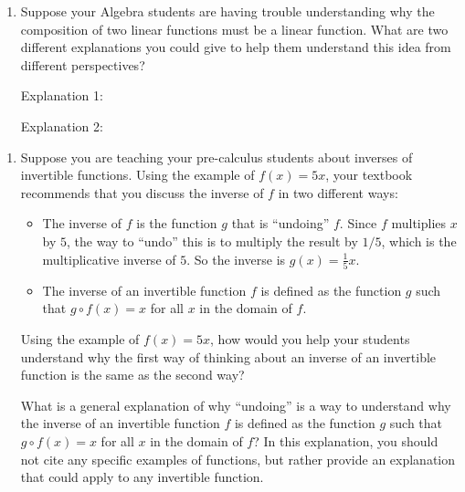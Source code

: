 \documentclass[10pt]{article}
\begin{document}
\newpage
\begin{enumerate}[resume]
\item Suppose your Algebra students are having trouble understanding why the composition of two linear functions must be a linear function. What are two different explanations you could give to help them understand this idea from different perspectives?

\begin{mdframed}
Explanation 1:
\vspace*{3in}
\end{mdframed}

\begin{mdframed}
Explanation 2: 
\vspace*{3in}
\end{mdframed}
\newpage 

\end{enumerate}

 
\begin{enumerate}[resume]
\item Suppose you are teaching your pre-calculus students about inverses of invertible functions. Using the example of $f(x)=5x$, your textbook recommends that you discuss the inverse of $f$ in two different ways:
	\begin{itemize}
	\item The inverse of $f$ is the function $g$ that is ``undoing'' $f$. Since $f$ multiplies $x$ by $5$, the way to ``undo'' this is to multiply the result by $1/5$, which is the multiplicative inverse of $5$. So the inverse is $g(x)=\frac{1}{5} x$. 
	\item The inverse of an invertible function $f$ is defined as the function $g$ such that $g \circ f(x)=x$ for all $x$ in the domain of $f$.
	\end{itemize}

Using the example of $f(x)=5x$, how would you help your students understand why the first way of thinking about an inverse of an invertible function is the same as the second way?
\begin{mdframed}
\vspace*{3in}
\end{mdframed}

What is a general explanation of why ``undoing'' is a way to understand why the inverse of an invertible function $f$ is defined as the function $g$ such that $g \circ f(x)=x$ for all $x$ in the domain of $f$? In this explanation, you should not cite any specific examples of functions, but rather provide an explanation that could apply to any invertible function.

\begin{mdframed}
\vspace*{3in}
\end{mdframed}

\end{enumerate}
\end{document}
